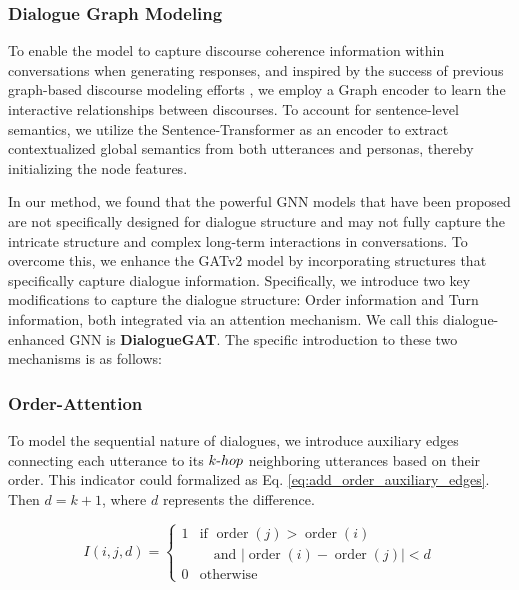 \documentclass[letterpaper]{article} %
\begin{document}
\subsubsection{Dialogue Graph Modeling}
To enable the model to capture discourse coherence information within conversations when generating responses, and inspired by the success of previous graph-based discourse modeling efforts \cite{dong-etal-2021-discourse,feng-etal-2021-dialogue,li-etal-2021-dadgraph}, we employ a Graph encoder to learn the interactive relationships between discourses. To account for sentence-level semantics, we utilize the Sentence-Transformer \cite{reimers-2019-sentence-bert} as an encoder to extract contextualized global semantics from both utterances and personas, thereby initializing the node features.

In our method, we found that the powerful GNN models that have been proposed are not specifically designed for dialogue structure and may not fully capture the intricate structure and complex long-term interactions in conversations. To overcome this, we enhance the GATv2 \cite{brody-etal-2022-gatv2} model by incorporating structures that specifically capture dialogue information. Specifically, we introduce two key modifications to capture the dialogue structure: Order information and Turn information, both integrated via an attention mechanism. We call this dialogue-enhanced GNN is \textbf{DialogueGAT}. The specific introduction to these two mechanisms is as follows:

\subsubsection{Order-Attention}
To model the sequential nature of dialogues, we introduce auxiliary edges connecting each utterance to its $k{\text -}hop$ neighboring utterances based on their order. This indicator could formalized as Eq. \ref{eq:add_order_auxiliary_edges}. Then $d=k+1$, where $d$ represents the difference.

\begin{equation}\label{eq:add_order_auxiliary_edges}
I(i, j, d) = 
\begin{cases} 
1 & \text{if } \operatorname{order}(j) > \operatorname{order}(i) \\
  & \quad \text{and } |\operatorname{order}(i) - \operatorname{order}(j)| < d \\
0 & \text{otherwise}
\end{cases}
\end{equation}
\end{document}
